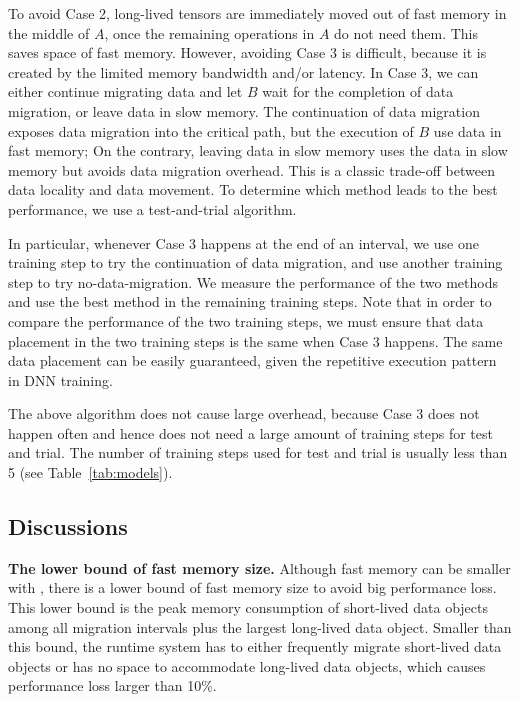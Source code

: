 To avoid Case 2, long-lived tensors are immediately moved out of fast memory in the middle of $A$, once the remaining operations in $A$ do not need them. This saves space of fast memory. However, avoiding Case 3 is difficult, because it is created by the limited memory bandwidth and/or latency. 
In Case 3, we can either continue migrating data and let $B$ wait for the completion of data migration, or leave data in slow memory. The continuation of data migration exposes data migration into the critical path, but the execution of $B$ use data in fast memory; On the contrary, leaving data in slow memory uses the data in slow memory but avoids data migration overhead. This is a classic trade-off between data locality and data movement. To determine which method leads to the best performance, we use a test-and-trial algorithm.

In particular, whenever Case 3 happens at the end of an interval, we use one training step to try the continuation of data migration, and use another training step to try no-data-migration. We measure the performance of the two methods and use the best method in the remaining training steps. Note that in order to compare the performance of the two training steps, we must ensure that data placement in the two training steps is the same when Case 3 happens. The same data placement can be easily guaranteed, given the repetitive execution pattern in DNN training. 

The above algorithm does not cause large overhead, because Case 3 does not happen often and hence does not need a large amount of training steps for test and trial. The number of training steps used for test and trial is usually \textcolor{check}{less than 5}  (see Table~\ref{tab:models}). 

\vspace{-10pt}
\subsection{Discussions}
\label{sec:discussion}

\textbf{The lower bound of fast memory size.} Although fast memory can be smaller with \name, there is a lower bound of fast memory size to avoid big performance loss. This lower bound is the peak memory consumption of short-lived data objects \textcolor{check}{among all migration intervals} plus the largest long-lived data object. Smaller than this bound, the runtime system has to either frequently migrate short-lived data objects or has no space to accommodate long-lived data objects, which causes performance loss larger than 10\%. 


